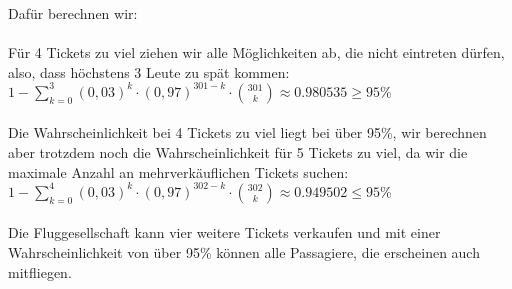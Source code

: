 \documentclass[a4paper]{article}
\begin{document}
Dafür berechnen wir:\\\\
Für 4 Tickets zu viel ziehen wir alle Möglichkeiten ab, die nicht eintreten dürfen, also, dass höchstens 3 Leute zu spät kommen:\\
\(1-\sum\limits^3_{k=0}(0,03)^k\cdot (0,97)^{301-k} \cdot \binom{301}{k} \approx 0.980535 \geq 95\%\)\\\\
Die Wahrscheinlichkeit bei 4 Tickets zu viel liegt bei über 95\%, wir berechnen aber trotzdem noch die Wahrscheinlichkeit für 5 Tickets zu viel, da wir die maximale Anzahl an mehrverkäuflichen Tickets suchen:
\(1 -\sum\limits^4_{k=0}(0,03)^k\cdot (0,97)^{302-k} \cdot \binom{302}{k} \approx 0.949502 \leq 95\%\)\\\\
Die Fluggesellschaft kann vier weitere Tickets verkaufen und mit einer Wahrscheinlichkeit von über 95\% können alle Passagiere, die erscheinen auch mitfliegen.
\end{document}
